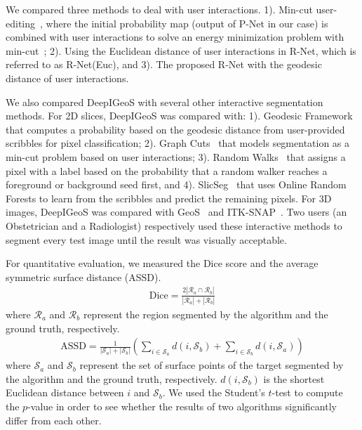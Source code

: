 \documentclass[10pt,journal,compsoc]{IEEEtran}
\begin{document}
We compared three methods to deal with user interactions. 1). Min-cut user-editing~\cite{Rother2004}, where the initial probability map (output of P-Net in our case) is combined with user interactions to solve an energy minimization problem with min-cut~\cite{Boykov2001}; 2). Using the Euclidean distance of user interactions in R-Net, which is referred to as R-Net(Euc), and 3). The proposed R-Net with the geodesic distance of user interactions.  


We also compared DeepIGeoS with several other interactive segmentation methods. For 2D slices, DeepIGeoS was compared with: 1). Geodesic Framework~\cite{Bai2007} that computes a probability based on the geodesic distance from user-provided scribbles for pixel classification; 2). Graph Cuts~\cite{Boykov2001} that models segmentation as a min-cut problem based on user interactions; 3). Random Walks~\cite{Grady2006a} that assigns a pixel with a label based on the probability that a random walker reaches a foreground or background seed first, and 4). SlicSeg~\cite{Wang2016} that uses Online Random Forests to learn from the scribbles and predict the remaining pixels. For 3D images, DeepIGeoS was compared with GeoS~\cite{Criminisi2008} and ITK-SNAP~\cite{Yushkevich2006}. Two users (an Obstetrician and a Radiologist) %
respectively used these interactive methods to segment every test image until the result was visually acceptable.


For quantitative evaluation, we measured the Dice score and the average symmetric surface distance (ASSD).  
\begin{align}
\text{Dice}=\frac{2|\mathcal{R}_a\cap \mathcal{R}_b|}{|\mathcal{R}_a|+|\mathcal{R}_b|}
\end{align} 
where $\mathcal{R}_a$ and $\mathcal{R}_b$ represent the region segmented by the algorithm and the ground truth, respectively.
\begin{align}
\text{ASSD}=\frac{1}{|\mathcal{S}_a|+|\mathcal{S}_b|}
\left(
\sum_{i\in \mathcal{S}_a}d(i,\mathcal{S}_b)+\sum_{i\in \mathcal{S}_b}
d(i,\mathcal{S}_a)
\right)
\label{eq:assd}
\end{align} 
where $\mathcal{S}_a$ and $\mathcal{S}_b$ represent the set of surface points of the target segmented by the algorithm and the ground truth, respectively. $d(i,\mathcal{S}_b)$ is the shortest Euclidean distance between $i$ and $\mathcal{S}_b$. We used the Student's $t$-test to compute the $p$-value in order to see whether the results of two algorithms significantly differ from each other. 
\end{document}
